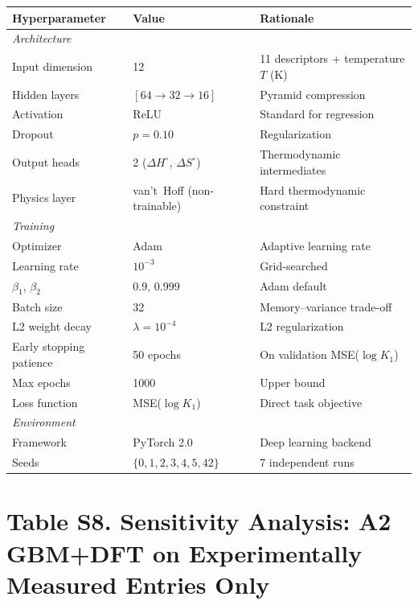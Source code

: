 \documentclass[journal=jacsat,manuscript=suppinfo]{achemso}
\begin{document}
\begin{table}[h!]
  \centering
  \begin{tabular}{@{}lll@{}}
    \toprule
    Hyperparameter & Value & Rationale \\
    \midrule
    \multicolumn{3}{l}{\textit{Architecture}} \\
    Input dimension & 12 & 11 descriptors + temperature $T$ (K) \\
    Hidden layers & $[64 \to 32 \to 16]$ & Pyramid compression \\
    Activation & ReLU & Standard for regression \\
    Dropout & $p = 0.10$ & Regularization \\
    Output heads & 2 ($\Delta H^\circ$, $\Delta S^\circ$) & Thermodynamic intermediates \\
    Physics layer & van't~Hoff (non-trainable) & Hard thermodynamic constraint \\
    \midrule
    \multicolumn{3}{l}{\textit{Training}} \\
    Optimizer & Adam\cite{Kingma2015} & Adaptive learning rate \\
    Learning rate & $10^{-3}$ & Grid-searched \\
    $\beta_1$, $\beta_2$ & 0.9, 0.999 & Adam default \\
    Batch size & 32 & Memory--variance trade-off \\
    L2 weight decay & $\lambda = 10^{-4}$ & L2 regularization \\
    Early stopping patience & 50 epochs & On validation MSE($\log K_1$) \\
    Max epochs & 1000 & Upper bound \\
    Loss function & MSE($\log K_1$) & Direct task objective \\
    \midrule
    \multicolumn{3}{l}{\textit{Environment}} \\
    Framework & PyTorch 2.0\cite{Paszke2019} & Deep learning backend \\
    Seeds & $\{0,1,2,3,4,5,42\}$ & 7 independent runs \\
    \bottomrule
  \end{tabular}
\end{table}


\newpage

\section*{Table S8. Sensitivity Analysis: A2 GBM+DFT on Experimentally Measured Entries Only}
\label{tab:s8}
\end{document}
